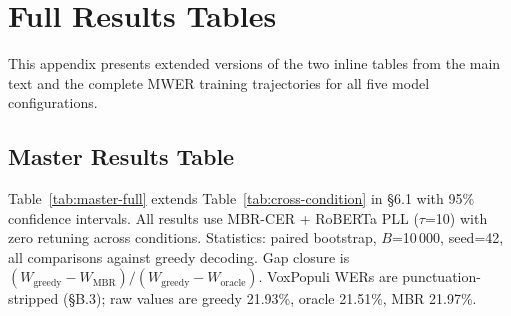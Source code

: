 \section{Full Results Tables}

This appendix presents extended versions of the two inline tables from the main text and the
complete MWER training trajectories for all five model configurations.



\subsection{Master Results Table}

Table~\ref{tab:master-full} extends Table~\ref{tab:cross-condition} in §6.1 with 95\% confidence
intervals. All results use MBR-CER + RoBERTa PLL ($\tau$=10) with zero retuning across conditions.
Statistics: paired bootstrap, $B$=10\,000, seed=42, all comparisons against greedy decoding. Gap
closure is $(W_{\text{greedy}} - W_{\text{MBR}}) / (W_{\text{greedy}} - W_{\text{oracle}})$.
VoxPopuli WERs are punctuation-stripped (§B.3); raw values are greedy 21.93\%, oracle 21.51\%,
MBR 21.97\%.

